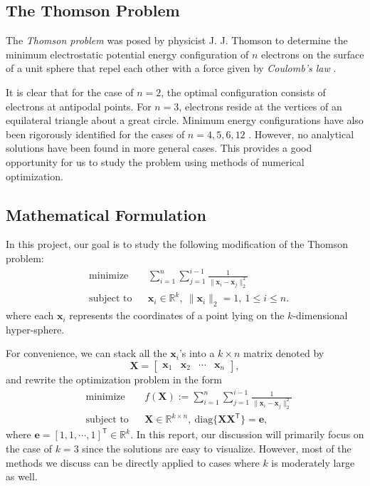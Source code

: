 \documentclass[11pt]{article}
\begin{document}
\subsection{The Thomson Problem}

The \emph{Thomson problem} was posed by physicist J. J. Thomson to determine the minimum electrostatic potential energy configuration of $n$ electrons on the surface of a unit sphere that repel each other with a force given by \emph{Coulomb's law} \cite{WikiThomson}.

It is clear that for the case of $n=2$, the optimal configuration consists of electrons at antipodal points.
For $n=3$, electrons reside at the vertices of an equilateral triangle about a great circle.
Minimum energy configurations have also been rigorously identified for the cases of $n = 4, 5, 6, 12$ \cite{WikiThomson}.
However, no analytical solutions have been found in more general cases.
This provides a good opportunity for us to study the problem using methods of numerical optimization.

\subsection{Mathematical Formulation}

In this project, our goal is to study the following  modification of the Thomson problem:
\begin{equation}\label{eq:Thomson1}
\begin{aligned}
& \text{minimize}
& & \sum_{i=1}^n\sum_{j=1}^{i-1}\frac{1}{\|\bm{x}_i-\bm{x}_j\|_2^2} \\
& \text{subject to}
& & \bm{x}_i\in\mathbb{R}^k,\ \|\bm{x}_i\|_2 = 1,\ 1 \le i \le n.
\end{aligned}
\end{equation}
where each $\bm{x}_i$ represents the coordinates of a point lying on the $k$-dimensional hyper-sphere.

For convenience, we can stack all the $\bm{x}_i$'s into a $k\times n$ matrix denoted by
$$ \bm{X} = \left[\begin{array}{cccc} \bm{x}_1 & \bm{x}_2 & \cdots & \bm{x}_n \end{array}\right], $$
and rewrite the optimization problem in the form
\begin{equation}\label{eq:Thomson2}
\begin{aligned}
& \text{minimize}
& & f(\bm{X}) := \sum_{i=1}^n\sum_{j=1}^{i-1}\frac{1}{\|\bm{x}_i-\bm{x}_j\|_2^2} \\
& \text{subject to}
& & \bm{X}\in\mathbb{R}^{k\times n},\ \text{diag}\{\bm{X}\bm{X}^\mathsf{T}\} = \bm{e},
\end{aligned}
\end{equation}
where $\bm{e}=[1,1,\cdots,1]^\mathsf{T}\in\mathbb{R}^k$.
In this report, our discussion will primarily focus on the case of $k=3$ since the solutions are easy to visualize. However, most of the methods we discuss can be directly applied to cases where $k$ is moderately large as well.
\end{document}
